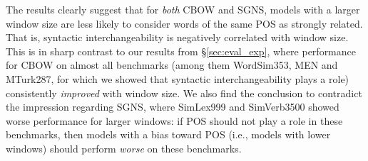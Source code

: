 \documentclass[11pt,a4paper]{article}
\begin{document}
    The results clearly suggest that for \textit{both} CBOW and SGNS,
    models with a larger window size are less likely to consider words
    of the same POS as strongly related.
    That is, syntactic interchangeability is negatively correlated with window size.
    This is in sharp contrast to our results from \S\ref{sec:eval_exp},
    where performance for CBOW on almost all benchmarks
    (among them  WordSim353, MEN and MTurk287, for which we showed that
    syntactic interchangeability plays a role) consistently
    \textit{improved} with window size.
    We also find the conclusion to contradict the impression regarding SGNS,
    where SimLex999 and SimVerb3500 showed worse performance for larger windows:
    if POS should not play a role in these benchmarks,
    then models with a bias toward POS (i.e., models with lower windows)
    should perform \textit{worse} on these benchmarks.
    
    
    
\end{document}
